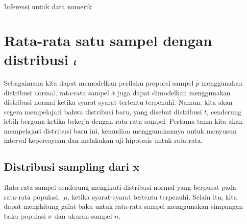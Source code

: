 \begin{chapterpage}{Inferensi untuk data numerik}
  \label{inferenceForNumericalData}
  \label{ch_inference_for_means}
\end{chapterpage}
\renewcommand{\chapterfolder}{ch_inference_for_means}





\section[Rata-rata satu sampel dengan distribusi $t$]
    {Rata-rata satu sampel dengan distribusi
        $\pmb{\MakeLowercase{t}}$}
\label{oneSampleMeansWithTDistribution}

\noindent%
Sebagaimana kita dapat memodelkan perilaku
proporsi sampel $\hat{p}$ menggunakan distribusi normal,
rata-rata sampel $\bar{x}$ juga dapat dimodelkan menggunakan
distribusi normal ketika syarat-syarat tertentu terpenuhi.
Namun, kita akan segera mempelajari bahwa distribusi baru,
yang disebut distribusi $t$,
cenderung lebih berguna ketika bekerja dengan rata-rata sampel.
Pertama-tama kita akan mempelajari distribusi baru ini,
kemudian menggunakannya untuk menyusun interval kepercayaan
dan melakukan uji hipotesis untuk rata-rata.


\subsection[Distribusi $\bar{x}$]
    {Distribusi sampling dari $\pmb{\bar{x}}$}

Rata-rata sampel cenderung mengikuti
distribusi normal yang berpusat pada rata-rata populasi,~$\mu$,
ketika syarat-syarat tertentu terpenuhi.
Selain itu, kita dapat menghitung galat baku untuk rata-rata
sampel menggunakan simpangan baku populasi $\sigma$
dan ukuran sampel $n$.

